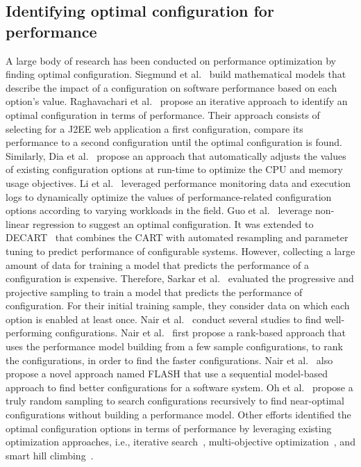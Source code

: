 \subsection{Identifying optimal configuration for performance} 
A large body of research has been conducted on performance optimization by finding optimal configuration. 
Siegmund et al.~\cite{RN2880} build mathematical models that describe the impact of a configuration on software performance based on each option's value. Raghavachari et al.~\cite{RN3537} propose an iterative approach to identify an optimal configuration in terms of performance. Their approach consists of selecting for a J2EE web application a first configuration, compare its performance to a second configuration until the optimal configuration is found. Similarly, Dia et al.~\cite{RN3543} propose an approach that automatically adjusts the values of existing configuration options at run-time to optimize the CPU and memory usage objectives.
Li et al.~\cite{LiAutoConfig} leveraged performance monitoring data and execution logs to dynamically optimize the values of performance-related configuration options according to varying workloads in the field. 
Guo et al.~\cite{RN3544} leverage non-linear regression to suggest an optimal configuration.
It was extended to DECART~\cite{DBLP:journals/ese/GuoYSASVCWY18} that combines the CART with automated resampling and parameter tuning to predict performance of configurable systems. However, collecting a large amount of data for training a model that predicts the performance of a configuration is expensive.
Therefore, Sarkar et al.~\cite{RN3089} evaluated the progressive and projective sampling to train a model that predicts the performance of configuration. For their initial training sample, they consider data on which each option is enabled at least once. 
Nair et al.~\cite{DBLP:conf/sigsoft/NairMSA17,DBLP:journals/tse/Nair0MSA20} conduct several studies to find well-performing configurations. 
Nair et al.~\cite{DBLP:conf/sigsoft/NairMSA17} first propose a rank-based approach that uses the performance model building from a few sample configurations, to rank the configurations, in order to find the faster configurations. 
Nair et al.~\cite{DBLP:journals/tse/Nair0MSA20} also propose a novel approach named FLASH that use a sequential model-based approach to find better configurations for a software system. 
Oh et al.~\cite{DBLP:conf/sigsoft/OhBMS17} propose a truly random sampling to search configurations recursively to find near-optimal configurations without building a performance model.
Other efforts identified the optimal configuration options in terms of performance by leveraging existing optimization approaches, i.e., iterative search~\cite{RN3545}, multi-objective optimization~\cite{singh2016optimizing}, and smart hill climbing~\cite{RN3518}.

